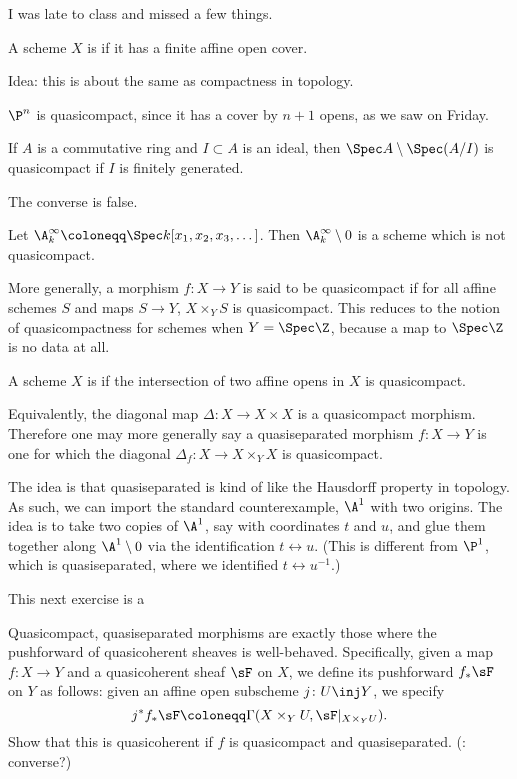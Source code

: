 I was late to class and missed a few things.
\begin{defn}
A scheme $X$ is  if it has a finite affine open cover.
\end{defn}
Idea: this is about the same as compactness in topology.
\begin{exm}
$\P^n$ is quasicompact, since it has a cover by $n+1$ opens, as we saw on Friday.
\end{exm}
\begin{prop}
If $A$ is a commutative ring and $I\subset A$ is an ideal, then $\Spec A\setminus \Spec(A/I)$ is quasicompact if
$I$ is finitely generated.
\end{prop}
The converse is false.
\begin{exm}
Let $\A_k^\infty\coloneqq\Spec k[x_1,x_2,x_3,\dotsc]$. Then $\A_k^\infty\setminus 0$ is a scheme which is not
quasicompact.
\end{exm}
\begin{rem}
More generally, a morphism $f\colon X\to Y$ is said to be quasicompact if for all affine schemes $S$ and maps $S\to
Y$, $X\times_Y S$ is quasicompact. This reduces to the notion of quasicompactness for schemes when $Y = \Spec\Z$,
because a map to $\Spec\Z$ is no data at all.
\end{rem}
\begin{defn}
A scheme $X$ is  if the intersection of two affine opens in $X$ is quasicompact.
\end{defn}
Equivalently, the diagonal map $\Delta\colon X\to X\times X$ is a quasicompact morphism. Therefore one may more
generally say a quasiseparated morphism $f\colon X\to Y$  is one for which the diagonal $\Delta_f\colon X\to
X\times_Y X$ is quasicompact.
\begin{exm}
The idea is that quasiseparated is kind of like the Hausdorff property in topology. As such, we can import the
standard counterexample, $\A^1$ with two origins. The idea is to take two copies of $\A^1$, say with coordinates
$t$ and $u$, and glue them together along $\A^1\setminus 0$ via the identification $t\leftrightarrow u$. (This is
different from $\P^1$, which is quasiseparated, where we identified $t\leftrightarrow u^{-1}$.)
\end{exm}
This next exercise is a 
\begin{ex}
Quasicompact, quasiseparated morphisms are exactly those where the pushforward of quasicoherent sheaves is
well-behaved. Specifically, given a map $f\colon X\to Y$ and a quasicoherent sheaf $\sF$ on $X$, we define its
pushforward $f_*\sF$ on $Y$ as follows: given an affine open subscheme $j\colon U \inj Y$, we specify
\[j^*f_*\sF \coloneqq\Gamma(X\times_Y U, \sF|_{X\times_Y U}).\]
Show that this is quasicoherent if $f$ is quasicompact and quasiseparated. (\TODO: converse?)
\end{ex}
